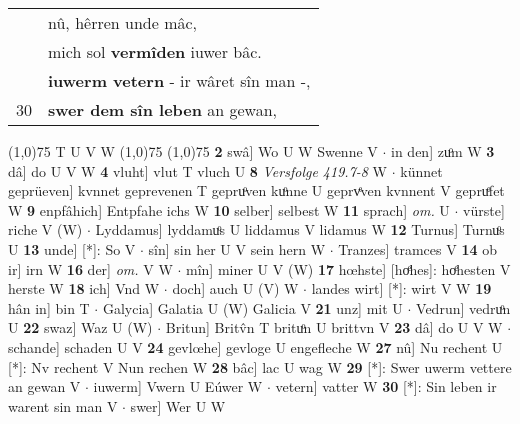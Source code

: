 \documentclass[8pt,a4paper,notitlepage]{article}
\begin{document}
\begin{table}[ht]
\begin{minipage}[t]{0.5\linewidth}
\begin{tabular}{rl}
 & nû, hêrren unde mâc,\\ 
 & mich sol \textbf{vermîden} iuwer bâc.\\ 
 & \textbf{iuwerm vetern} - ir wâret sîn man -,\\ 
30 & \textbf{swer dem sîn leben} an gewan,\\ 
\end{tabular}
\scriptsize
\line(1,0){75} \newline
T U V W \newline
\line(1,0){75} \newline
\newline
\line(1,0){75} \newline
\textbf{2} swâ] Wo U W Swenne V  $\cdot$ in den] zuͦm W \textbf{3} dâ] do U V W \textbf{4} vluht] vlut T vluch U \textbf{8} \textit{Versfolge 419.7-8} W   $\cdot$ künnet geprüeven] kvnnet geprevenen T gepruͦven kuͦnne U geprvͤven kvnnent V gepruͤfet W \textbf{9} enpfâhich] Entpfahe ichs W \textbf{10} selber] selbest W \textbf{11} sprach] \textit{om.} U  $\cdot$ vürste] riche V (W)  $\cdot$ Lyddamus] lyddamuͦs U liddamus V lidamus W \textbf{12} Turnus] Turnuͦs U \textbf{13} unde] [*]: So V  $\cdot$ sîn] sin her U V sein hern W  $\cdot$ Tranzes] tramces V \textbf{14} ob ir] irn W \textbf{16} der] \textit{om.} V W  $\cdot$ mîn] miner U V (W) \textbf{17} hœhste] [hoͤhes]: hoͤhesten V herste W \textbf{18} ich] Vnd W  $\cdot$ doch] auch U (V) W  $\cdot$ landes wirt] [*]: wirt V W \textbf{19} hân in] bin T  $\cdot$ Galycia] Galatia U (W) Galicia V \textbf{21} unz] mit U  $\cdot$ Vedrun] vedruͦn U \textbf{22} swaz] Waz U (W)  $\cdot$ Britun] Britv̂n T brituͦn U brittvn V \textbf{23} dâ] do U V W  $\cdot$ schande] schaden U V \textbf{24} gevlœhe] gevloge U engefleche W \textbf{27} nû] Nu rechent U [*]: Nv rechent V Nun rechen W \textbf{28} bâc] lac U wag W \textbf{29} [*]: Swer uwerm vettere an gewan V  $\cdot$ iuwerm] Vwern U Eúwer W  $\cdot$ vetern] vatter W \textbf{30} [*]: Sin leben ir warent sin man V  $\cdot$ swer] Wer U W \newline
\end{minipage}
\end{table}
\end{document}
